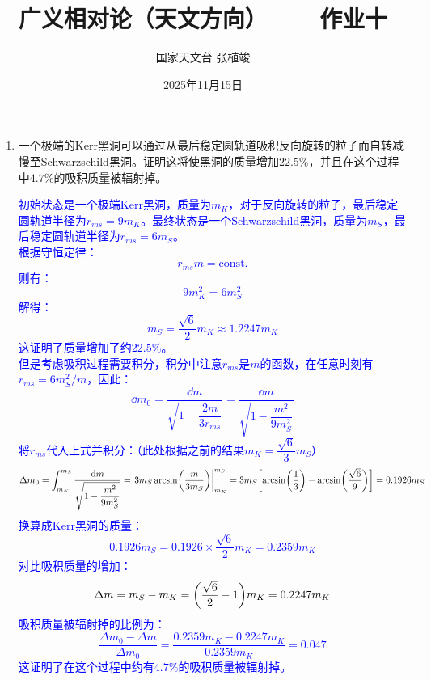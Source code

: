 \documentclass[a4paper]{article}
\title{\textbf{广义相对论（天文方向）\ \ \ \ 作业十}}
\author{国家天文台 张植竣}
\date{2025年11月15日}
\begin{document}
\maketitle

\begin{enumerate}
    \item 一个极端的Kerr黑洞可以通过从最后稳定圆轨道吸积反向旋转的粒子而自转减慢至Schwarzschild黑洞。证明这将使黑洞的质量增加$22.5\%$，并且在这个过程中$4.7\%$的吸积质量被辐射掉。

    \textcolor{blue}{
        初始状态是一个极端Kerr黑洞，质量为$m_K$，对于反向旋转的粒子，最后稳定圆轨道半径为$r_{ms} = 9m_K$。最终状态是一个Schwarzschild黑洞，质量为$m_S$，最后稳定圆轨道半径为$r_{ms} = 6m_S$。 \\
        根据守恒定律：
        \[
            r_{ms} m = \mathrm{const.}
        \]
        则有：
        \[
            9m_K^2 = 6m_S^2
        \]
        解得：
        \[
            m_S = \frac{\sqrt{6}}{2} m_K \approx 1.2247 m_K
        \]
        这证明了质量增加了约$22.5\%$。 \\
        但是考虑吸积过程需要积分，积分中注意$r_{ms}$是$m$的函数，在任意时刻有$r_{ms} = 6m_S^2/m$，因此：
        \[
            \dd{m_0} = \frac{\dd{m}}{\sqrt{1 - \dfrac{2m}{3r_{ms}}}} = \frac{\dd{m}}{\sqrt{1 - \dfrac{m^2}{9m_S^2}}}
        \]
        将$r_{ms}$代入上式并积分：（此处根据之前的结果$m_K = \dfrac{\sqrt{6}}{3}m_S$）
        \[
            \Delta m_0 = \int_{m_K}^{m_S} \frac{\dd{m}}{\sqrt{1 - \dfrac{m^2}{9m_S^2}}} = \eval{3m_S \arcsin(\frac{m}{3m_S})}_{m_K}^{m_S} = 3m_S \qty[\arcsin(\frac{1}{3}) - \arcsin(\frac{\sqrt{6}}{9})] = 0.1926 m_S
        \]
        换算成Kerr黑洞的质量：
        \[
            0.1926 m_S = 0.1926 \times \frac{\sqrt{6}}{2} m_K = 0.2359 m_K
        \]
        对比吸积质量的增加：
        \[
            \Delta m = m_S - m_K = \qty(\frac{\sqrt{6}}{2} - 1)m_K = 0.2247 m_K
        \]
        吸积质量被辐射掉的比例为：
        \[
            \frac{\Delta m_0 - \Delta m}{\Delta m_0} = \frac{0.2359 m_K - 0.2247 m_K}{0.2359 m_K} = 0.047
        \]
        这证明了在这个过程中约有$4.7\%$的吸积质量被辐射掉。
    }
\end{enumerate}
\end{document}
